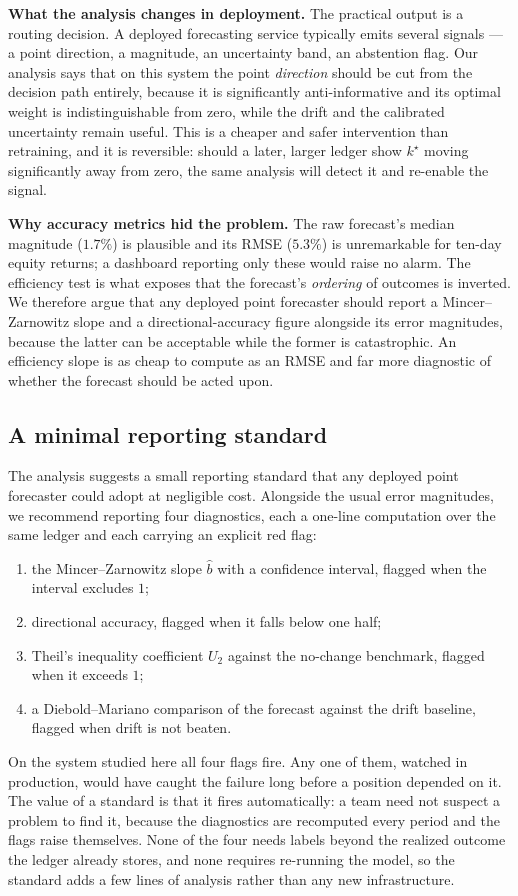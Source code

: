 \documentclass[10pt,twocolumn,twoside]{eec_style}
\begin{document}
\textbf{What the analysis changes in deployment.} The practical output is a routing
decision. A deployed forecasting service typically emits several signals --- a point
direction, a magnitude, an uncertainty band, an abstention flag. Our analysis says that on
this system the point \emph{direction} should be cut from the decision path entirely,
because it is significantly anti-informative and its optimal weight is indistinguishable
from zero, while the drift and the calibrated uncertainty remain useful. This is a
cheaper and safer intervention than retraining, and it is reversible: should a later,
larger ledger show $k^\star$ moving significantly away from zero, the same analysis will
detect it and re-enable the signal.

\textbf{Why accuracy metrics hid the problem.} The raw forecast's median magnitude
($1.7\%$) is plausible and its RMSE ($5.3\%$) is unremarkable for ten-day equity
returns; a dashboard reporting only these would raise no alarm. The efficiency test is
what exposes that the forecast's \emph{ordering} of outcomes is inverted. We therefore
argue that any deployed point forecaster should report a Mincer--Zarnowitz slope and a
directional-accuracy figure alongside its error magnitudes, because the latter can be
acceptable while the former is catastrophic. An efficiency slope is as cheap to compute
as an RMSE and far more diagnostic of whether the forecast should be acted upon.

\subsection{A minimal reporting standard}
\label{sec:reporting}
The analysis suggests a small reporting standard that any deployed point forecaster could
adopt at negligible cost. Alongside the usual error magnitudes, we recommend reporting
four diagnostics, each a one-line computation over the same ledger and each carrying an
explicit red flag:
\begin{enumerate}
\item the Mincer--Zarnowitz slope $\hat b$ with a confidence interval, flagged when the
interval excludes $1$;
\item directional accuracy, flagged when it falls below one half;
\item Theil's inequality coefficient $U_2$ against the no-change benchmark, flagged when
it exceeds $1$;
\item a Diebold--Mariano comparison of the forecast against the drift baseline, flagged
when drift is not beaten.
\end{enumerate}
On the system studied here all four flags fire. Any one of them, watched in production,
would have caught the failure long before a position depended on it. The value of a
standard is that it fires automatically: a team need not suspect a problem to find it,
because the diagnostics are recomputed every period and the flags raise themselves. None
of the four needs labels beyond the realized outcome the ledger already stores, and none
requires re-running the model, so the standard adds a few lines of analysis rather than
any new infrastructure.
\end{document}
